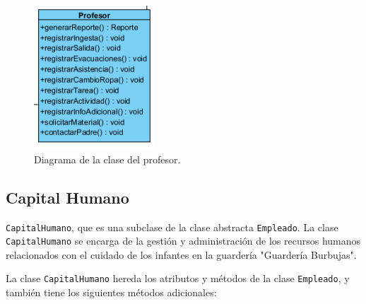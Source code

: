 \begin{figure}[htbp]
\centering
\includegraphics[width=0.4\textwidth]{images/arqui/profesor.png}
\caption{Diagrama de la clase del profesor.}
\label{fig:entidadProfesor}
\end{figure}

\clearpage
\subsection{Capital Humano}

\texttt{CapitalHumano}, que es una subclase de la clase abstracta \texttt{Empleado}. La clase \texttt{CapitalHumano} se encarga de la gestión y administración de los recursos humanos relacionados con el cuidado de los infantes en la guardería "Guardería Burbujas".

La clase \texttt{CapitalHumano} hereda los atributos y métodos de la clase \texttt{Empleado}, y también tiene los siguientes métodos adicionales:

